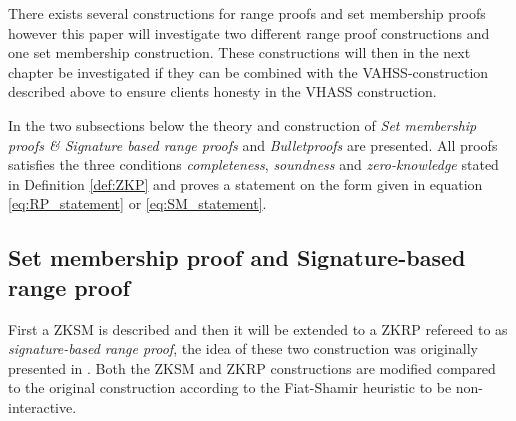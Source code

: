 There exists several constructions for range proofs and set membership proofs however this paper will investigate two different range proof constructions and one set membership construction. These constructions will then in the next chapter be investigated if they can be combined with the VAHSS-construction described above to ensure clients honesty in the  VHASS construction.


In the two subsections below the theory and construction of \textit{Set membership proofs \& Signature based range proofs}  and \textit{Bulletproofs} are presented. All proofs satisfies the three conditions \textit{completeness}, \textit{soundness} and \textit{zero-knowledge} stated in Definition \ref{def:ZKP} and proves a statement on the form given in equation \eqref{eq:RP_statement} or \eqref{eq:SM_statement}.




\subsection{Set membership proof and Signature-based  range proof}
First a ZKSM is described and then it will be extended to a ZKRP refereed to as \textit{signature-based range proof}, the idea of these two construction was originally presented in \cite{RANGE-SET}. Both the ZKSM and ZKRP constructions are modified compared to the original construction according to the Fiat-Shamir heuristic to be non-interactive.

